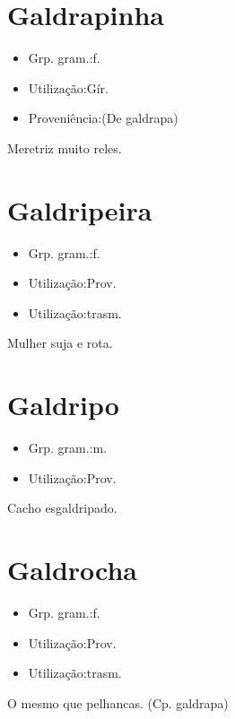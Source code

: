 \section{Galdrapinha}
\begin{itemize}
\item {Grp. gram.:f.}
\end{itemize}
\begin{itemize}
\item {Utilização:Gír.}
\end{itemize}
\begin{itemize}
\item {Proveniência:(De \textunderscore galdrapa\textunderscore )}
\end{itemize}
Meretriz muito reles.
\section{Galdripeira}
\begin{itemize}
\item {Grp. gram.:f.}
\end{itemize}
\begin{itemize}
\item {Utilização:Prov.}
\end{itemize}
\begin{itemize}
\item {Utilização:trasm.}
\end{itemize}
Mulher suja e rota.
\section{Galdripo}
\begin{itemize}
\item {Grp. gram.:m.}
\end{itemize}
\begin{itemize}
\item {Utilização:Prov.}
\end{itemize}
Cacho esgaldripado.
\section{Galdrocha}
\begin{itemize}
\item {Grp. gram.:f.}
\end{itemize}
\begin{itemize}
\item {Utilização:Prov.}
\end{itemize}
\begin{itemize}
\item {Utilização:trasm.}
\end{itemize}
O mesmo que \textunderscore pelhancas\textunderscore .
(Cp. \textunderscore galdrapa\textunderscore )

